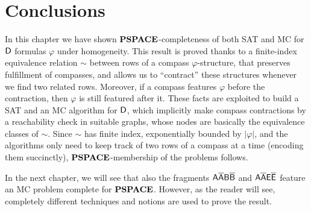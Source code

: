\section{Conclusions}
In this chapter we have shown $\textbf{PSPACE}$-completeness of both SAT and MC for $\mathsf{D}$ formulas $\varphi$ under homogeneity.
This result is proved thanks to a finite-index equivalence relation $\sim$ between rows of a compass $\varphi$-structure, that preserves fulfillment of compasses, and allows us to ``contract'' these structures whenever we find two related rows. Moreover, if a compass features $\varphi$ before the contraction, then $\varphi$ is still featured after it. These facts are exploited to build a SAT and an MC algorithm for $\mathsf{D}$, which implicitly make compass contractions by a reachability check in suitable graphs, whose nodes are basically the equivalence classes of $\sim$.
Since $\sim$ has finite index, exponentially bounded by $|\varphi|$,
and the algorithms
only need to keep track of two rows of a compass at a time (encoding them succinctly), $\textbf{PSPACE}$-membership of the problems follows.

In the next chapter, we will see that also the fragments $\mathsf{A\overline{A}B\overline{B}}$ and $\mathsf{A\overline{A}E\overline{E}}$ feature an MC problem complete for $\textbf{PSPACE}$.
However, as the reader will see, completely different techniques and notions are used to prove the result.